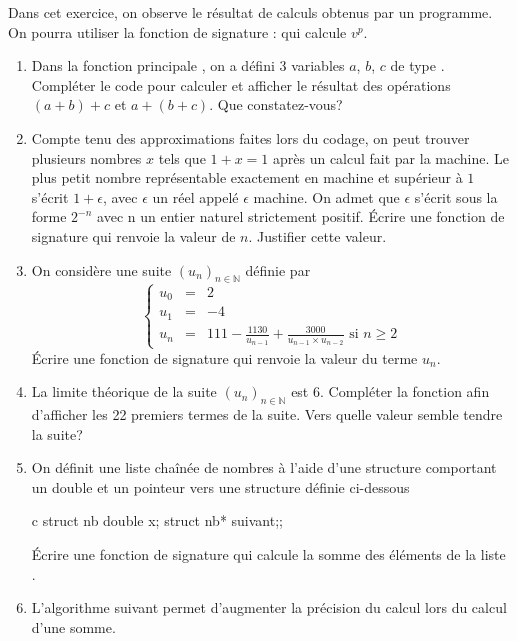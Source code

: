 \documentclass[a4paper, 11pt]{article}
\newenvironment{code-env}
{
  \mdfsetup{
    roundcorner=2pt,
    topline=true,
    leftline=true,
    bottomline=true,
    rightline=true,
    innertopmargin=4pt,
    innerbottommargin=4pt,
    innerrightmargin=4pt,
    innerlinewidth=1pt,
    backgroundcolor={gray!10},
    linecolor={gray!40},
    linewidth=0.1pt,
  }
  \begin{mdframed}[]
  }{\end{mdframed}}
\newenvironment{fancy-code}[1]
  {\VerbatimEnvironment
    \begin{code-env}
    \begin{verbatim}}
 {\end{verbatim}\end{code-env}}
\begin{document}
Dans cet exercice, on observe le résultat de calculs obtenus par un programme. On pourra utiliser la fonction de signature :  qui calcule $v^p$.

    \begin{enumerate}
        \item Dans la fonction principale , on a défini 3 variables $a$, $b$, $c$ de type . Compléter le code pour calculer et afficher le résultat des opérations $(a+b)+c$ et $a+(b+c)$. Que constatez-vous?
				\item Compte tenu des approximations faites lors du codage, on peut trouver plusieurs nombres $x$ tels que $1+x=1$ après un calcul fait par la machine. Le plus petit nombre représentable exactement en machine et supérieur à $1$ s'écrit $1+\epsilon$, avec $\epsilon$ un réel appelé $\epsilon$ machine.  On admet que $\epsilon$ s'écrit sous la forme $2^{-n}$ avec n un entier naturel strictement positif. \'Ecrire une fonction de signature  qui renvoie la valeur de $n$. Justifier cette valeur.
				\item On considère une suite $(u_n)_{n\in \mathbb{N}}$ définie par
$$
\left\{
    \begin{array}{lll}
        u_0 &=& 2\\
				u_1 &=&-4\\
        u_n&=&111-\frac{1130}{u_{n-1}}+\frac{3000}{u_{n-1}\times u_{n-2}} \text{ si } n \geq 2
    \end{array}
\right.
$$
\'Ecrire une fonction de signature  qui renvoie la valeur du terme $u_n$.
\item La limite théorique de la suite $(u_n)_{n\in \mathbb{N}}$ est 6. Compléter la fonction  afin d'afficher les 22 premiers termes de la suite. Vers quelle valeur semble tendre la suite?
				\item On définit une liste chaînée de nombres à l'aide d'une structure  comportant un double et un pointeur vers une structure  définie ci-dessous

\medskip

\begin{fancy-code}{c}
struct nb {double x; struct nb* suivant;};
\end{fancy-code}

				Écrire une fonction de signature  qui calcule la somme des éléments de la liste .
				\item L'algorithme suivant permet d'augmenter la précision du calcul lors du calcul d'une somme.
\begin{center}
  \begin{minipage}{15cm}
    

\end{minipage}
\end{center}
\end{enumerate}
\end{document}
